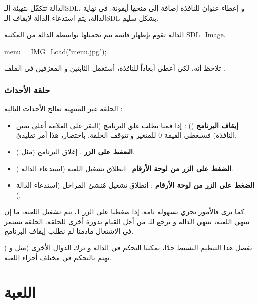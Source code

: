 الدالة
تتكفّل بتهيئة الـ\textenglish{SDL}،
و إعطاء عنوان للنافذة إضافة إلى منحها أيقونة. في نهاية الدالة، يتم استدعاء الدالة 
 لإيقاف الـ\textenglish{SDL}
بشكل سليم.

الدالة تقوم بإظهار قائمة يتم تحميلها بواسطة الدالة 
من المكتبة
\textenglish{SDL\_Image}.

\begin{Csource}
menu = IMG_Load("menu.jpg");
\end{Csource}

تلاحظ أنه، لكي أعطي أبعاداً للنافذة، أستعمل الثابتين
و
المعرّفين في الملف
.

\subsubsection{حلقة الأحداث}

الحلقة غير المنتهية تعالج الأحداث التالية :

\begin{itemize}
	\item \textbf{إيقاف البرنامج}
	() :
	إذا قمنا بطلب غلق البرنامج (النقر على العلامة
	أعلى يمين النافذة) فسنعطي القيمة 0 للمتغير
	و تتوقف الحلقة. باختصار، هذا أمر تقليديّ.
	\item \textbf{الضغط على الزر
		} :
	إغلاق البرنامج (مثل
	).
	\item \textbf{الضغط على الزر
	من لوحة الأرقام} :
	انطلاق تشغيل اللعبة (استدعاء الدالة 
	).
	\item \textbf{الضغط على الزر
	من لوحة الأرقام} :
	انطلاق تشغيل مُنشئ المراحل (استدعاء الدالة
	).
\end{itemize}

كما ترى فالأمور تجري بسهولة تامة. إذا ضغطنا على الزر 1، يتم تشغيل اللعبة، ما إن تنتهي اللعبة، تنتهي الدالة
و نرجع للـ
من أجل القيام بدورة أخرى للحلقة. الحلقة تستمر في الاشتغال مادمنا لم نطلب إيقاف البرنامج.

بفضل هذا التنظيم البسيط جدّا، يمكننا التحكم في الدالة
و ترك الدوال الأخرى (مثل
و
)
تهتم بالتحكم في مختلف أجزاء اللعبة.

\section{اللعبة}

